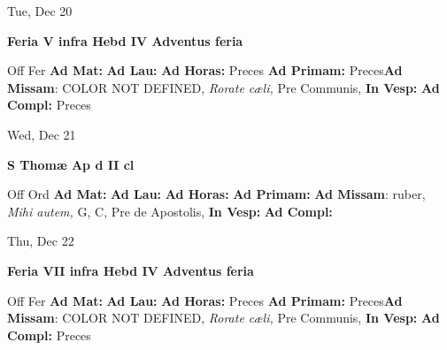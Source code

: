 \documentclass[10pt]{memoir}
\begin{document}
\begin{center}
\begin{minipage}{3.5in}
\vspace{2em}
\begin{center}Tue, Dec 20
\end{center}
\textbf{ \large Feria V infra Hebd IV Adventus
\textnormal{\normalsize feria}}

\begin{justify}Off Fer
\textbf{Ad Mat: }
\textbf{Ad Lau: }
\textbf{Ad Horas: }Preces
\textbf{Ad Primam: }Preces\textbf{Ad Missam}: COLOR NOT DEFINED, \textit{Rorate cæli,} Pre Communis, 
\textbf{In Vesp: }
\textbf{Ad Compl: }Preces
\end{justify}
\end{minipage}
\end{center}

\begin{center}
\begin{minipage}{3.5in}
\vspace{2em}
\begin{center}Wed, Dec 21
\end{center}
\textbf{ \large S Thomæ Ap
\textnormal{\normalsize d II cl}}

\begin{justify}Off Ord
\textbf{Ad Mat: }
\textbf{Ad Lau: }
\textbf{Ad Horas: }
\textbf{Ad Primam: }\textbf{Ad Missam}: ruber, \textit{Mihi autem,} G, C, Pre de Apostolis, 
\textbf{In Vesp: }
\textbf{Ad Compl: }
\end{justify}
\end{minipage}
\end{center}

\begin{center}
\begin{minipage}{3.5in}
\vspace{2em}
\begin{center}Thu, Dec 22
\end{center}
\textbf{ \large Feria VII infra Hebd IV Adventus
\textnormal{\normalsize feria}}

\begin{justify}Off Fer
\textbf{Ad Mat: }
\textbf{Ad Lau: }
\textbf{Ad Horas: }Preces
\textbf{Ad Primam: }Preces\textbf{Ad Missam}: COLOR NOT DEFINED, \textit{Rorate cæli,} Pre Communis, 
\textbf{In Vesp: }
\textbf{Ad Compl: }Preces
\end{justify}
\end{minipage}
\end{center}
\end{document}
